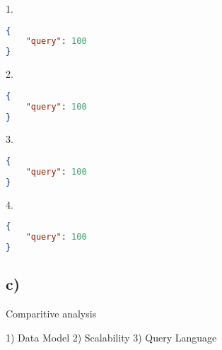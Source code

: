 \documentclass{article}
\begin{document}
\hspace{0cm}1.
\begin{lstlisting}[language=json]
{
    "query": 100
} 
\end{lstlisting} 
\hspace{0cm}2.
\begin{lstlisting}[language=json]
{                   
    "query": 100
}
\end{lstlisting}
\hspace{0cm}3. 
\begin{lstlisting}[language=json]
{
    "query": 100
}
\end{lstlisting}
\hspace{0cm}4. 
\begin{lstlisting}[language=json]
{
    "query": 100
}
\end{lstlisting}

\subsection*{\small c)}

Comparitive analysis

1) Data Model
2) Scalability
3) Query Language
\end{document}
